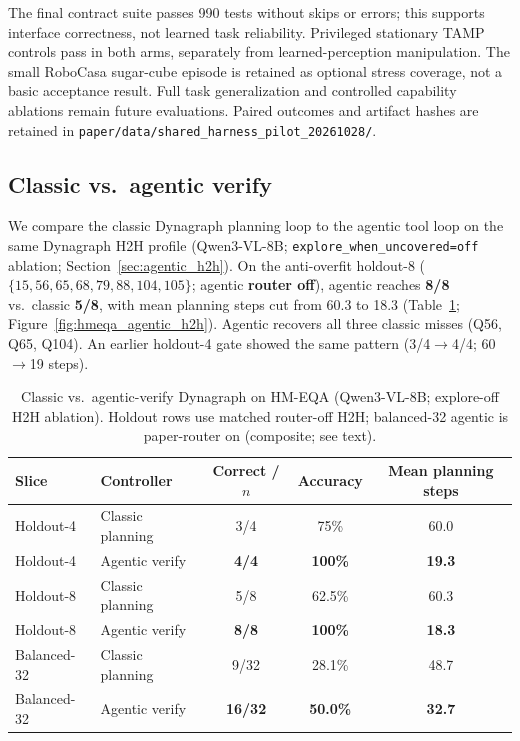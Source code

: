 The final contract suite passes 990 tests without skips or errors; this supports
interface correctness, not learned task reliability. Privileged stationary TAMP
controls pass in both arms, separately from learned-perception manipulation.
The small RoboCasa sugar-cube episode is retained as optional stress coverage,
not a basic acceptance result. Full task generalization and controlled
capability ablations remain future evaluations. Paired outcomes and artifact
hashes are retained in \texttt{paper/data/shared\_harness\_pilot\_20261028/}.

\subsection{Classic vs.\ agentic verify}
\label{sec:agentic_results}

We compare the classic Dynagraph planning loop to the agentic tool loop on the same Dynagraph H2H profile (Qwen3-VL-8B; \texttt{explore\_when\_uncovered=off} ablation; Section~\ref{sec:agentic_h2h}).
On the anti-overfit holdout-8 ($\{15,56,65,68,79,88,104,105\}$; agentic \textbf{router off}), agentic reaches \textbf{8/8} vs.\ classic \textbf{5/8}, with mean planning steps cut from 60.3 to 18.3 (Table~\ref{tab:agentic_h2h}; Figure~\ref{fig:hmeqa_agentic_h2h}).
Agentic recovers all three classic misses (Q56, Q65, Q104).
An earlier holdout-4 gate showed the same pattern (3/4$\rightarrow$4/4; 60$\rightarrow$19 steps).
\begin{table}[t]
  \centering
  \caption{Classic vs.\ agentic-verify Dynagraph on HM-EQA (Qwen3-VL-8B; explore-off H2H ablation).
  Holdout rows use matched router-off H2H; balanced-32 agentic is paper-router on (composite; see text).}
  \label{tab:agentic_h2h}
  \small
  \begin{tabular}{@{}llccc@{}}
    \toprule
    Slice & Controller & Correct / $n$ & Accuracy & Mean planning steps \\
    \midrule
    Holdout-4 & Classic planning & 3/4 & 75\% & 60.0 \\
    Holdout-4 & Agentic verify & \textbf{4/4} & \textbf{100\%} & \textbf{19.3} \\
    \midrule
    Holdout-8 & Classic planning & 5/8 & 62.5\% & 60.3 \\
    Holdout-8 & Agentic verify & \textbf{8/8} & \textbf{100\%} & \textbf{18.3} \\
    \midrule
    Balanced-32 & Classic planning & 9/32 & 28.1\% & 48.7 \\
    Balanced-32 & Agentic verify & \textbf{16/32} & \textbf{50.0\%} & \textbf{32.7} \\
    \bottomrule
  \end{tabular}
\end{table}

